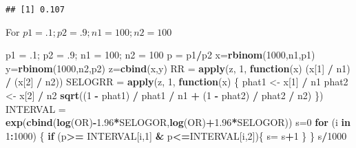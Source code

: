 \documentclass[]{article}
\newenvironment{Shaded}{\begin{snugshade}}{\end{snugshade}}
\newcommand{\KeywordTok}[1]{\textcolor[rgb]{0.13,0.29,0.53}{\textbf{#1}}}
\newcommand{\DecValTok}[1]{\textcolor[rgb]{0.00,0.00,0.81}{#1}}
\newcommand{\FloatTok}[1]{\textcolor[rgb]{0.00,0.00,0.81}{#1}}
\newcommand{\StringTok}[1]{\textcolor[rgb]{0.31,0.60,0.02}{#1}}
\newcommand{\ControlFlowTok}[1]{\textcolor[rgb]{0.13,0.29,0.53}{\textbf{#1}}}
\newcommand{\OperatorTok}[1]{\textcolor[rgb]{0.81,0.36,0.00}{\textbf{#1}}}
\newcommand{\NormalTok}[1]{#1}
\begin{document}
\begin{verbatim}
## [1] 0.107
\end{verbatim}

For \(p1 = .1; p2 = .9; n1 = 100; n2 = 100\)

\begin{Shaded}
\begin{Highlighting}[]
\NormalTok{p1 =}\StringTok{ }\NormalTok{.}\DecValTok{1}\NormalTok{; p2 =}\StringTok{ }\NormalTok{.}\DecValTok{9}\NormalTok{; n1 =}\StringTok{ }\DecValTok{100}\NormalTok{; n2 =}\StringTok{ }\DecValTok{100}
\NormalTok{p =}\StringTok{ }\NormalTok{p1}\OperatorTok{/}\NormalTok{p2}
\NormalTok{x=}\KeywordTok{rbinom}\NormalTok{(}\DecValTok{1000}\NormalTok{,n1,p1)}
\NormalTok{y=}\KeywordTok{rbinom}\NormalTok{(}\DecValTok{1000}\NormalTok{,n2,p2)}
\NormalTok{z=}\KeywordTok{cbind}\NormalTok{(x,y)}
\NormalTok{RR =}\StringTok{ }\KeywordTok{apply}\NormalTok{(z, }\DecValTok{1}\NormalTok{,}
\ControlFlowTok{function}\NormalTok{(x) (x[}\DecValTok{1}\NormalTok{] }\OperatorTok{/}\StringTok{ }\NormalTok{n1) }\OperatorTok{/}\StringTok{ }\NormalTok{(x[}\DecValTok{2}\NormalTok{] }\OperatorTok{/}\StringTok{ }\NormalTok{n2))}
\NormalTok{SELOGRR =}\StringTok{ }\KeywordTok{apply}\NormalTok{(z, }\DecValTok{1}\NormalTok{,}
\ControlFlowTok{function}\NormalTok{(x) \{}
\NormalTok{phat1 <-}\StringTok{ }\NormalTok{x[}\DecValTok{1}\NormalTok{] }\OperatorTok{/}\StringTok{ }\NormalTok{n1}
\NormalTok{phat2 <-}\StringTok{ }\NormalTok{x[}\DecValTok{2}\NormalTok{] }\OperatorTok{/}\StringTok{ }\NormalTok{n2}
\KeywordTok{sqrt}\NormalTok{((}\DecValTok{1} \OperatorTok{-}\StringTok{ }\NormalTok{phat1) }\OperatorTok{/}\StringTok{ }\NormalTok{phat1 }\OperatorTok{/}\StringTok{ }\NormalTok{n1 }\OperatorTok{+}\StringTok{ }\NormalTok{(}\DecValTok{1} \OperatorTok{-}\StringTok{ }\NormalTok{phat2) }\OperatorTok{/}\StringTok{ }\NormalTok{phat2 }\OperatorTok{/}\StringTok{ }\NormalTok{n2)}
\NormalTok{\})}
\NormalTok{INTERVAL =}\StringTok{ }\KeywordTok{exp}\NormalTok{(}\KeywordTok{cbind}\NormalTok{(}\KeywordTok{log}\NormalTok{(OR)}\OperatorTok{-}\FloatTok{1.96}\OperatorTok{*}\NormalTok{SELOGOR,}\KeywordTok{log}\NormalTok{(OR)}\OperatorTok{+}\FloatTok{1.96}\OperatorTok{*}\NormalTok{SELOGOR))}
\NormalTok{s=}\DecValTok{0}
\ControlFlowTok{for}\NormalTok{ (i }\ControlFlowTok{in} \DecValTok{1}\OperatorTok{:}\DecValTok{1000}\NormalTok{) \{}
  \ControlFlowTok{if}\NormalTok{ (p}\OperatorTok{>=}\StringTok{ }\NormalTok{INTERVAL[i,}\DecValTok{1}\NormalTok{] }\OperatorTok{&}\StringTok{ }\NormalTok{p}\OperatorTok{<=}\NormalTok{INTERVAL[i,}\DecValTok{2}\NormalTok{])\{}
\NormalTok{    s=}\StringTok{ }\NormalTok{s}\OperatorTok{+}\DecValTok{1}
\NormalTok{  \}}
\NormalTok{\}}
\NormalTok{s}\OperatorTok{/}\DecValTok{1000}
\end{Highlighting}
\end{Shaded}
\end{document}
